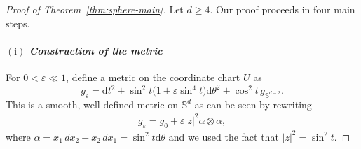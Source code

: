 \documentclass[11pt,reqno]{amsart}
\numberwithin{equation}{section}
\theoremstyle{definition}
\theoremstyle{remark}
\newcommand{\ud}{\mathrm{d}}
\newcommand{\0}{\emptyset}
\newcommand{\bbS}{\mathbb S}
\begin{document}
\begin{proof}[Proof of Theorem~\ref{thm:sphere-main}]
Let \(d\geq 4\). Our proof proceeds in four main steps. 
\paragraph{$\mathrm{(i)}$ \textit{Construction of the metric}} For \(0<\varepsilon\ll 1\), define a metric on the coordinate chart $U$ as 
\begin{equation}\label{eq:geps-coordinate}
g_\varepsilon=
        \ud t^2 +
        \sin^2t\bigl(1+\varepsilon\sin^4t\bigr)\ud \theta^2 + \cos^2t\,g_{\mathbb S^{d-2}}.
\end{equation}
This is a smooth, well-defined metric on $\bbS^d$ as can be seen by rewriting 
\begin{align}\label{eq:geps-global}
g_\varepsilon= g_0+\varepsilon |z|^2\alpha\otimes\alpha, 
\end{align}
where $\alpha=x_1\,dx_2-x_2\,dx_1=\sin^2 t \ud \theta$ and we used the fact that $|z|^2=\sin^2 t.$

\end{proof}
\end{document}
